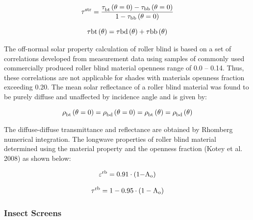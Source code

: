 \begin{equation}
{\rm{\tau }}_{}^{{\rm{str}}} = \frac{{{\rm{\tau }}_{{\rm{bt}}}^{}\left( {{\rm{\theta }} = {\rm{0}}} \right) - {{\rm{\tau }}_{{\rm{bb}}}}\left( {{\rm{\theta }} = {\rm{0}}} \right)}}{{{\rm{1}} - {{\rm{\tau }}_{{\rm{bb}}}}\left( {{\rm{\theta }} = {\rm{0}}} \right)}}
\end{equation}

\begin{equation}
{\rm{\tau bt}}\left( {\rm{\theta }} \right) = {\rm{\tau bd}}\left( {\rm{\theta }} \right) + {\rm{\tau bb}}\left( {\rm{\theta }} \right)
\end{equation}

The off-normal solar property calculation of roller blind is based on a set of correlations developed from measurement data using samples of commonly used commercially produced roller blind material openness range of 0.0 -- 0.14. Thus, these correlations are not applicable for shades with materials openness fraction exceeding 0.20. The mean solar reflectance of a roller blind material was found to be purely diffuse and unaffected by incidence angle and is given by:

\begin{equation}
{\rm{\rho }}_{{\rm{bt}}}^{}\left( {{\rm{\theta }} = {\rm{0}}} \right) = {\rm{\rho }}_{{\rm{bd}}}^{}\left( {{\rm{\theta }} = {\rm{0}}} \right) = {\rm{\rho }}_{{\rm{bt}}}^{}\left( {\rm{\theta }} \right) = {\rm{\rho }}_{{\rm{bd}}}^{}\left( {\rm{\theta }} \right)
\end{equation}

The diffuse-diffuse transmittance and reflectance are obtained by Rhomberg numerical integration. The longwave properties of roller blind material determined using the material property and the openness fraction (Kotey et al. 2008) as shown below:

\begin{equation}
{\varepsilon ^{{\rm{rb}}}} = {\rm{0}}{\rm{.91}} \cdot \left( {{\rm{1 - }}{{\rm{A}}_{\rm{o}}}} \right)
\end{equation}

\begin{equation}
{\tau ^{{\rm{rb}}}} = {\rm{1}} - {\rm{0}}{\rm{.95}} \cdot \left( {{\rm{1}} - {{\rm{A}}_{\rm{o}}}} \right)
\end{equation}

\subsubsection{Insect Screens}\label{insect-screens}


